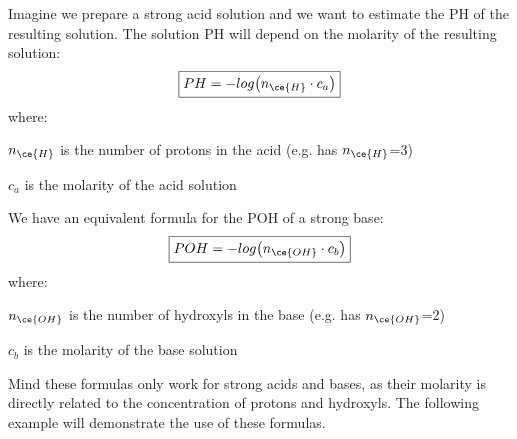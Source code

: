 \documentclass[main.tex]{subfiles}
\newcommand\chapterlabel{acids}
\begin{document}
\begin{description}
\begin{center}
\end{center}



\item[\docfilehook{\smallpencil PH of strong electrolyte solutions}{PH of strong electrolyte solutions}] Imagine we prepare a strong acid solution and we want to estimate the PH of the resulting solution. The solution PH will depend on the molarity of the resulting solution:
\begin{equation}
\boxed{PH=-log \big(n_{\ce{H}}\cdot c_a \big)  }\label{\chapterlabel:equation7}
\end{equation}
where:
\begin{where}
 \item $n_{\ce{H}}$   is the number of protons in the acid (e.g.  has $n_{\ce{H}}$=3)
 \item $c_a$   is the molarity of the acid solution
\end{where}
We have an equivalent formula for the POH of a strong base: 
\begin{equation}
\boxed{POH=-log \big(n_{\ce{OH}}\cdot c_b \big)  }\label{\chapterlabel:equation8}
\end{equation}
where:
\begin{where}
 \item $n_{\ce{OH}}$   is the number of hydroxyls in the base  (e.g.  has $n_{\ce{OH}}$=2)
 \item $c_b$   is the molarity of the base solution
\end{where}
Mind these formulas only work for strong acids and bases, as their molarity is directly related to the concentration of protons and hydroxyls. The following example will demonstrate the use of these formulas.



\end{description}
\end{document}
